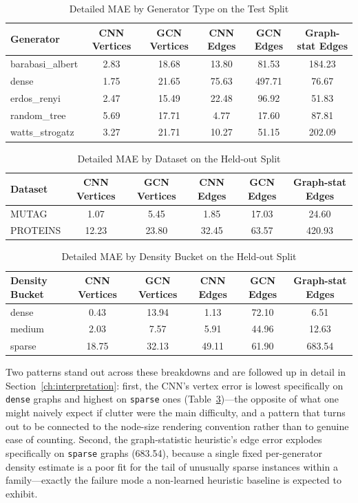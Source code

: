 \documentclass[11pt,letterpaper]{article}
\numberwithin{equation}{section}
\numberwithin{figure}{section}
\numberwithin{table}{section}
\begin{document}
\begin{table}[htbp]
\centering
\caption{Detailed MAE by Generator Type on the Test Split}
\label{tab:generator_breakdown}
\begin{tabular}{lccccc}
\toprule
Generator & CNN Vertices & GCN Vertices & CNN Edges & GCN Edges & Graph-stat Edges \\
\midrule
barabasi\_albert & 2.83 & 18.68 & 13.80 & 81.53 & 184.23 \\
dense & 1.75 & 21.65 & 75.63 & 497.71 & 76.67 \\
erdos\_renyi & 2.47 & 15.49 & 22.48 & 96.92 & 51.83 \\
random\_tree & 5.69 & 17.71 & 4.77 & 17.60 & 87.81 \\
watts\_strogatz & 3.27 & 21.71 & 10.27 & 51.15 & 202.09 \\
\bottomrule
\end{tabular}
\end{table}

\begin{table}[htbp]
\centering
\caption{Detailed MAE by Dataset on the Held-out Split}
\label{tab:dataset_breakdown}
\begin{tabular}{lccccc}
\toprule
Dataset & CNN Vertices & GCN Vertices & CNN Edges & GCN Edges & Graph-stat Edges \\
\midrule
MUTAG & 1.07 & 5.45 & 1.85 & 17.03 & 24.60 \\
PROTEINS & 12.23 & 23.80 & 32.45 & 63.57 & 420.93 \\
\bottomrule
\end{tabular}
\end{table}

\begin{table}[htbp]
\centering
\caption{Detailed MAE by Density Bucket on the Held-out Split}
\label{tab:density_breakdown}
\begin{tabular}{lccccc}
\toprule
Density Bucket & CNN Vertices & GCN Vertices & CNN Edges & GCN Edges & Graph-stat Edges \\
\midrule
dense & 0.43 & 13.94 & 1.13 & 72.10 & 6.51 \\
medium & 2.03 & 7.57 & 5.91 & 44.96 & 12.63 \\
sparse & 18.75 & 32.13 & 49.11 & 61.90 & 683.54 \\
\bottomrule
\end{tabular}
\end{table}

Two patterns stand out across these breakdowns and are followed up in detail in Section~\ref{ch:interpretation}: first, the CNN's vertex error is lowest specifically on \texttt{dense} graphs and highest on \texttt{sparse} ones (Table~\ref{tab:density_breakdown})---the opposite of what one might naively expect if clutter were the main difficulty, and a pattern that turns out to be connected to the node-size rendering convention rather than to genuine ease of counting. Second, the graph-statistic heuristic's edge error explodes specifically on \texttt{sparse} graphs (683.54), because a single fixed per-generator density estimate is a poor fit for the tail of unusually sparse instances within a family---exactly the failure mode a non-learned heuristic baseline is expected to exhibit.
\end{document}
